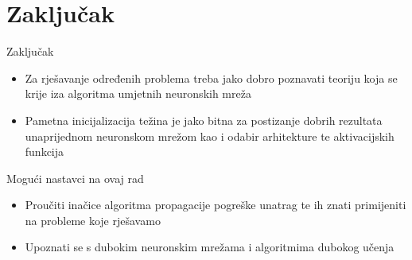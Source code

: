 \documentclass{beamer}
\begin{document}
\section{Zaključak}
	\begin{frame}{Zaključak}
		\begin{itemize}
	        \item Za rješavanje određenih problema treba jako dobro poznavati teoriju koja se krije iza algoritma umjetnih neuronskih mreža
	        \smallskip
			\item Pametna inicijalizacija težina je jako bitna za postizanje dobrih rezultata unaprijednom neuronskom mrežom kao i odabir arhitekture te aktivacijskih funkcija 
		\end{itemize}
		
		\bigskip		
		\pause		
		
		\begin{block}{Mogući nastavci na ovaj rad}
			\begin{itemize}
				\item Proučiti inačice algoritma propagacije pogreške unatrag te ih znati primijeniti na probleme koje rješavamo
				\item Upoznati se s dubokim neuronskim mrežama i algoritmima dubokog učenja
			\end{itemize}
		\end{block}
	\end{frame}
\end{document}
